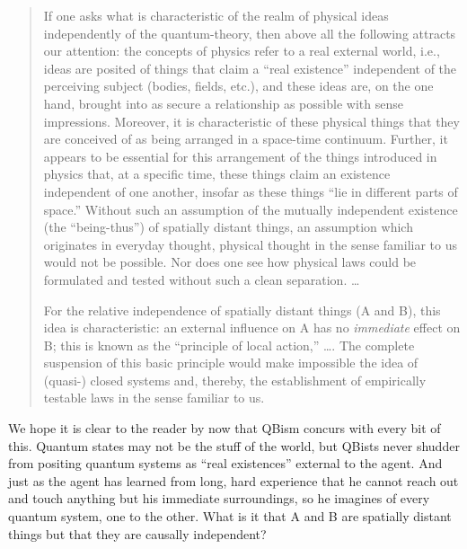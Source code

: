 \begin{quotation}\small
If one asks what is characteristic of the realm of physical ideas independently of the quantum-theory, then above all the following attracts our attention: the concepts of physics refer to a real external world, i.e., ideas are posited of things that claim a ``real existence'' independent of the perceiving subject (bodies, fields, etc.), and these ideas are, on the one hand, brought into as secure a relationship as possible with sense impressions. Moreover, it is characteristic of these physical things that they are conceived of as being arranged in a space-time continuum. Further, it appears to be essential for this arrangement of the things introduced in physics that, at a specific time, these things claim an existence independent of one another, insofar as these things ``lie in different parts of space.'' Without such an assumption of the mutually independent existence (the ``being-thus'') of spatially distant things, an assumption which originates in everyday thought, physical thought in the sense familiar
to us would not be possible. Nor does one see how physical laws could be formulated and tested without such a clean separation. \ldots %

For the relative independence of spatially distant things (A and B), this idea is characteristic: an external influence on A has no {\it immediate\/} effect on B; this is known as the ``principle of local action,'' \ldots. %
The complete suspension of this basic principle would make impossible the idea of (quasi-) closed systems and, thereby, the establishment of empirically testable laws in the sense familiar to us.
\end{quotation}
We hope it is clear to the reader by now that QBism concurs with every bit of this.  Quantum states may not be the stuff of the world, but QBists never shudder from positing quantum systems as ``real existences'' external to the agent.  And just as the agent has learned from long, hard experience that he cannot reach out and touch anything but his immediate surroundings, so he imagines of every quantum system, one to the other.  What is it that A and B are spatially distant things but that they are causally independent?

